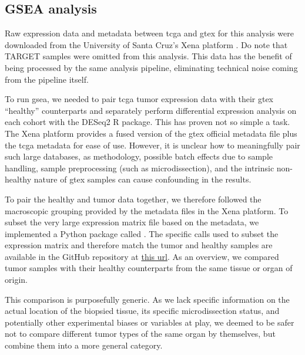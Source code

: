 \subsection{GSEA analysis}

Raw expression data and metadata between \gls{tcga} and \gls{gtex} for this analysis were downloaded from the University of Santa Cruz's Xena platform \cite{UCSCXena}.
Do note that TARGET samples were omitted from this analysis.
This data has the benefit of being processed by the same analysis pipeline, eliminating technical noise coming from the pipeline itself.

To run \gls{gsea}, we needed to pair \gls{tcga} tumor expression data with their \gls{gtex} ``healthy'' counterparts and separately perform differential expression analysis on each cohort with the DESeq2 R package.
This has proven not so simple a task.
The Xena platform provides a fused version of the \gls{gtex} official metadata file plus the \gls{tcga} metadata for ease of use.
However, it is unclear how to meaningfully pair such large databases, as methodology, possible batch effects due to sample handling, sample preprocessing (such as microdissection), and the intrinsic non-healthy nature of \gls{gtex} samples can cause confounding in the results.

To pair the healthy and tumor data together, we therefore followed the macroscopic grouping provided by the metadata files in the Xena platform.
To subset the very large expression matrix file based on the metadata, we implemented a Python package called .
The specific calls used to subset the expression matrix and therefore match the tumor and healthy samples are available in the GitHub repository at \href{https://github.com/CMA-Lab/transportome_profiler/blob/main/src/run_dea/tcga_gtex_queries.json}{this url}.
As an overview, we compared tumor samples with their healthy counterparts from the same tissue or organ of origin.

This comparison is purposefully generic.
As we lack specific information on the actual location of the biopsied tissue, its specific microdissection status, and potentially other experimental biases or variables at play, we deemed to be safer not to compare different tumor types of the same organ by themselves, but combine them into a more general category.

